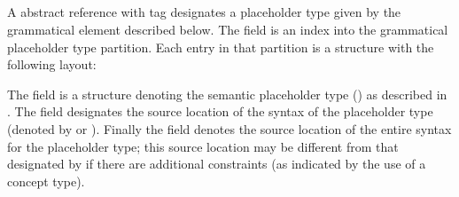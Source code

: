 
\subsection{}
\label{sec:ifc:SyntaxSort:PlaceholderTypeSpecifier}

A  abstract reference with tag 
designates a placeholder type given by the grammatical element described below.
The  field is an index into the grammatical placeholder type 
partition.  Each entry in that partition is a structure with the following
layout:
%
\begin{figure}[H]
	\centering
	\label{fig:ifc:SyntaxSort:PlaceholderTypeSpecifier}
\end{figure}
%
The  field is a structure denoting the semantic placeholder type
 () as described in .  The  field
designates the source location of the syntax of the placeholder type
(denoted by  or ).  Finally the  field
denotes the source location of the entire syntax for the placeholder type;
this source location may be different from that designated by 
if there are additional constraints (as indicated by the use of a concept type).



\subsection{}
\label{sec:ifc:SyntaxSort:TypeSpecifierSeq}

\begin{figure}[H]
	\centering
	\label{fig:ifc:SyntaxSort:TypeSpecifierSeq}
\end{figure}

